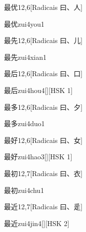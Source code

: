 \begin{entry}{最优}{12,6}[Radicais ⽈、⼈]
  \begin{phonetics}{最优}{zui4you1}
  \end{phonetics}
\end{entry}

\begin{entry}{最先}{12,6}[Radicais ⽈、⼉]
  \begin{phonetics}{最先}{zui4xian1}
  \end{phonetics}
\end{entry}

\begin{entry}{最后}{12,6}[Radicais ⽈、⼝]
  \begin{phonetics}{最后}{zui4hou4}[][HSK 1]
  \end{phonetics}
\end{entry}

\begin{entry}{最多}{12,6}[Radicais ⽈、⼣]
  \begin{phonetics}{最多}{zui4duo1}
  \end{phonetics}
\end{entry}

\begin{entry}{最好}{12,6}[Radicais ⽈、⼥]
  \begin{phonetics}{最好}{zui4hao3}[][HSK 1]
  \end{phonetics}
\end{entry}

\begin{entry}{最初}{12,7}[Radicais ⽈、⾐]
  \begin{phonetics}{最初}{zui4chu1}
  \end{phonetics}
\end{entry}

\begin{entry}{最近}{12,7}[Radicais ⽈、⾡]
  \begin{phonetics}{最近}{zui4jin4}[][HSK 2]
  \end{phonetics}
\end{entry}

